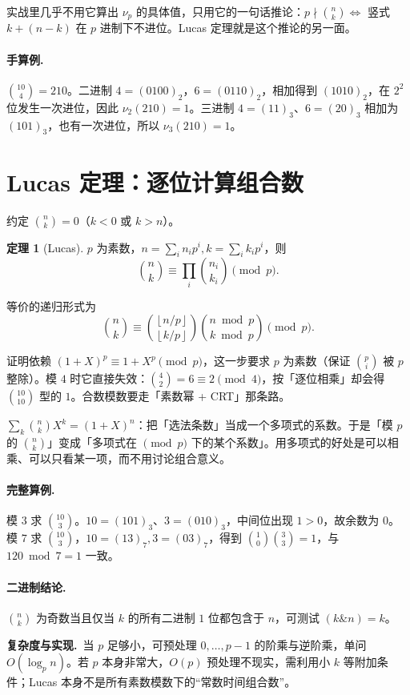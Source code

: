 \documentclass[UTF8,a4paper,11pt,twoside,openright,fontset=fandol]{ctexbook}
\theoremstyle{definition}
\newtheorem{theorem}[definition]{定理}
\newcommand{\floor}[1]{\left\lfloor #1\right\rfloor}
\newcommand{\cost}{\par\noindent\textbf{复杂度与实现.}\ }
\begin{document}
\begin{tip}
实战里几乎不用它算出 $\nu_p$ 的具体值，只用它的一句话推论：$p\nmid\binom nk\iff$ 竖式 $k+(n-k)$ 在 $p$ 进制下不进位。Lucas 定理就是这个推论的另一面。
\end{tip}


\paragraph{手算例.} $\binom{10}{4}=210$。二进制 $4=(0100)_2$，$6=(0110)_2$，相加得到 $(1010)_2$，在 $2^2$ 位发生一次进位，因此 $\nu_2(210)=1$。三进制 $4=(11)_3$、$6=(20)_3$ 相加为 $(101)_3$，也有一次进位，所以 $\nu_3(210)=1$。
\section{Lucas 定理：逐位计算组合数}
约定 $\binom nk=0$（$k<0$ 或 $k>n$）。
\begin{theorem}[Lucas]
$p$ 为素数，$n=\sum_i n_ip^i,k=\sum_i k_ip^i$，则
\[
 \binom nk\equiv\prod_i\binom{n_i}{k_i}\pmod p.
\]


等价的递归形式为
\[
 \binom nk\equiv\binom{\floor{n/p}}{\floor{k/p}}
 \binom{n\bmod p}{k\bmod p}\pmod p.
\]
\end{theorem}

\begin{tip}
证明依赖 $(1+X)^p\equiv1+X^p\pmod p$，这一步要求 $p$ 为素数（保证 $\binom pi$ 被 $p$ 整除）。模 $4$ 时它直接失效：$\binom42=6\equiv2\pmod4$，按「逐位相乘」却会得 $\binom{10}{10}$ 型的 $1$。合数模数要走「素数幂 + CRT」那条路。
\end{tip}


\begin{tip}
$\sum_k\binom nk X^k=(1+X)^n$：把「选法条数」当成一个多项式的系数。于是「模 $p$ 的 $\binom nk$」变成「多项式在 $\pmod p$ 下的某个系数」。用多项式的好处是可以相乘、可以只看某一项，而不用讨论组合意义。
\end{tip}

\paragraph{完整算例.} 模 $3$ 求 $\binom{10}{3}$。$10=(101)_3$、$3=(010)_3$，中间位出现 $1>0$，故余数为 $0$。模 $7$ 求 $\binom{10}{3}$，$10=(13)_7,3=(03)_7$，得到 $\binom10\binom33=1$，与 $120\bmod7=1$ 一致。
\paragraph{二进制结论.} $\binom nk$ 为奇数当且仅当 $k$ 的所有二进制 $1$ 位都包含于 $n$，可测试 $(k\mathbin{\&}n)=k$。
\cost 当 $p$ 足够小，可预处理 $0,\ldots,p-1$ 的阶乘与逆阶乘，单问 $O(\log_p n)$。若 $p$ 本身非常大，$O(p)$ 预处理不现实，需利用小 $k$ 等附加条件；Lucas 本身不是所有素数模数下的“常数时间组合数”。
\end{document}
